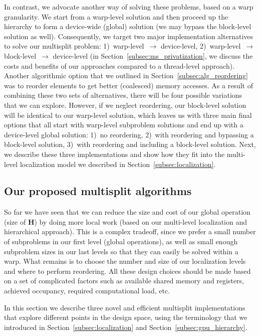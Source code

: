 In contrast, we advocate another way of solving these problems, based on a warp granularity. We start from a warp-level solution and then proceed up the hierarchy to form a device-wide (global) solution (we may bypass the block-level solution as well).
Consequently, we target two major implementation alternatives to solve our multisplit problem: 1)~warp-level~$\rightarrow$ device-level, 2)~warp-level~$\rightarrow$ block-level~$\rightarrow$ device-level
(in Section~\ref{subsec:ms_privatization}, we discuss the costs and benefits of our approaches compared to a thread-level approach).
Another algorithmic option that we outlined in Section~\ref{subsec:alg_reordering} was to reorder elements to get better (coalesced) memory accesses.
As a result of combining these two sets of alternatives, there will be four possible variations that we can explore.
However, if we neglect reordering, our block-level solution will be identical to our warp-level solution, which leaves us with three main final options that all start with warp-level subproblem solutions and end up with a device-level global solution: 1)~no reordering, 2)~with reordering and bypassing a block-level solution, 3)~with reordering and including a block-level solution.
Next, we describe these three implementations and show how they fit into the multi-level localization model we described in Section~\ref{subsec:localization}.

\subsection{Our proposed multisplit algorithms}
So far we have seen that we can reduce the size and cost of our global operation (size of $\mathbf{H}$) by doing more local work (based on our multi-level localization and hierarchical approach). This is a complex tradeoff, since we prefer a small number of subproblems in our first level (global operations), as well as small enough subproblem sizes in our last levels so that they can easily be solved within a warp.
What remains is to choose the number and size of our localization levels and where to perform reordering. All these design choices should be made based on a set of complicated factors such as available shared memory and registers, achieved occupancy, required computational load, etc.

In this section we describe three novel and efficient multisplit implementations that explore different points in the design space, using the terminology that we introduced in Section~\ref{subsec:localization} and Section~\ref{subsec:gpu_hierarchy}.

